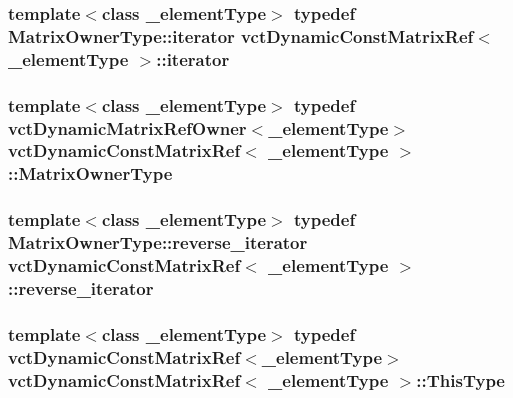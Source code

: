 \subsubsection[{iterator}]{\setlength{\rightskip}{0pt plus 5cm}template$<$class \+\_\+element\+Type$>$ typedef {\bf Matrix\+Owner\+Type\+::iterator} {\bf vct\+Dynamic\+Const\+Matrix\+Ref}$<$ \+\_\+element\+Type $>$\+::{\bf iterator}}\label{classvct_dynamic_const_matrix_ref_ab330f3add78ec03ac1f50861ae7d12ac}
\hypertarget{classvct_dynamic_const_matrix_ref_a86a40c99d49dbdb2edd71bfb82ee105b}{}
\subsubsection[{Matrix\+Owner\+Type}]{\setlength{\rightskip}{0pt plus 5cm}template$<$class \+\_\+element\+Type$>$ typedef {\bf vct\+Dynamic\+Matrix\+Ref\+Owner}$<$\+\_\+element\+Type$>$ {\bf vct\+Dynamic\+Const\+Matrix\+Ref}$<$ \+\_\+element\+Type $>$\+::{\bf Matrix\+Owner\+Type}}\label{classvct_dynamic_const_matrix_ref_a86a40c99d49dbdb2edd71bfb82ee105b}
\hypertarget{classvct_dynamic_const_matrix_ref_a05e475dde6f7edcd23536c620da182db}{}
\subsubsection[{reverse\+\_\+iterator}]{\setlength{\rightskip}{0pt plus 5cm}template$<$class \+\_\+element\+Type$>$ typedef {\bf Matrix\+Owner\+Type\+::reverse\+\_\+iterator} {\bf vct\+Dynamic\+Const\+Matrix\+Ref}$<$ \+\_\+element\+Type $>$\+::{\bf reverse\+\_\+iterator}}\label{classvct_dynamic_const_matrix_ref_a05e475dde6f7edcd23536c620da182db}
\hypertarget{classvct_dynamic_const_matrix_ref_a9c784be5ec51408ff2830ef67f2c01c8}{}
\subsubsection[{This\+Type}]{\setlength{\rightskip}{0pt plus 5cm}template$<$class \+\_\+element\+Type$>$ typedef {\bf vct\+Dynamic\+Const\+Matrix\+Ref}$<$\+\_\+element\+Type$>$ {\bf vct\+Dynamic\+Const\+Matrix\+Ref}$<$ \+\_\+element\+Type $>$\+::{\bf This\+Type}}\label{classvct_dynamic_const_matrix_ref_a9c784be5ec51408ff2830ef67f2c01c8}


